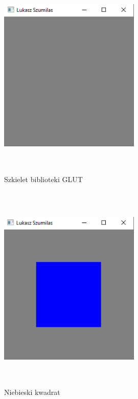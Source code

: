 \documentclass[polish,polish,a4paper]{article}
\begin{document}
    \begin{figure}[h!]
      \centering
      \includegraphics[width=0.6\textwidth,height=10cm]{empty.png}
      \caption{Szkielet biblioteki GLUT}
      \label{fig:zrzut1}
    \end{figure}
    
        \begin{figure}[h!]
      \centering
      \includegraphics[width=0.6\textwidth,height=10cm]{kwadrat.png}
      \caption{Niebieski kwadrat}
      \label{fig:zrzut1}
    \end{figure}
    
\end{document}
